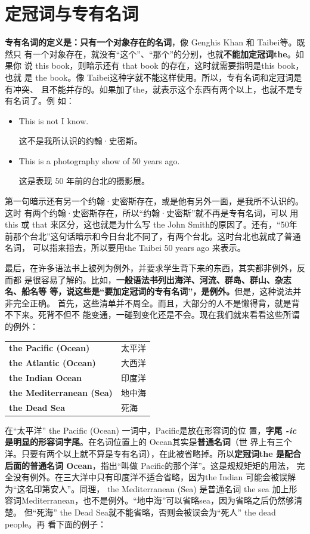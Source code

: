 \section{定冠词与专有名词}

\textbf{专有名词的定义是：只有一个对象存在的名词}，像 Genghis Khan 和 Taibei等。既然只
有一个对象存在，就没有“这个”、“那个”的分别，也就\textbf{不能加定冠词the}。如果你
说 this book，则暗示还有 that book 的存在，这时就需要指明是this book，也就
是 the book。像 Taibei这种字就不能这样使用。所以，专有名词和定冠词是有冲突、
且不能并存的。如果加了the，就表示这个东西有两个以上，也就不是专有名词了。例
如：

\begin{itemize}
\item  This is not  I know.

这不是我所认识的约翰·史密斯。
\item  This is a photography show of  50 years ago.

这是表现 50 年前的台北的摄影展。
\end{itemize}

第一句暗示还有另一个约翰·史密斯存在，或是他有另外一面，是我所不认识的。这时
有两个约翰·史密斯存在，所以“约翰·史密斯”就不再是专有名词，可以
用this 或 that 来区分，这也就是为什么写 the John Smith的原因了。还有，“50年
前那个台北”这句话暗示和今日台北不同了，有两个台北。这时台北也就成了普通名词，
可以指来指去，所以要用the Taibei 50 years ago 来表示。

最后，在许多语法书上被列为例外，并要求学生背下来的东西，其实都非例外，反而都
是很容易了解的。比如，\textbf{一般语法书列出海洋、河流、群岛、群山、杂志名、船名等
  等，说这些是“要加定冠词的专有名词”，是例外。}但是，这种说法并非完全正确。
首先，这些清单并不周全。而且，大部分的人不是懒得背，就是背不下来。死背不但不
能变通，一碰到变化还是不会。现在我们就来看看这些所谓的例外：

\begin{longtable}[]{@{}ll@{}}
  \textbf{the Pacific (Ocean)} & 太平洋 \\
  \textbf{the Atlantic (Ocean)} & 大西洋 \\
  \textbf{the Indian Ocean} & 印度洋 \\
  \textbf{the Mediterranean (Sea)} & 地中海 \\
  \textbf{the Dead Sea} & 死海 \\
\end{longtable}

在“太平洋” the Pacific (Ocean) 一词中，Pacific是放在形容词的位
置，\textbf{字尾 \emph{-ic} 是明显的形容词字尾}。在名词位置上的 Ocean其实是\textbf{普通名词}（世
界上有三个洋。只要有两个以上就不算是专有名词），在此被省略掉。所以\textbf{定冠词the
  是配合后面的普通名词 Ocean}，指出“叫做 Pacific的那个洋”。这是规规矩矩的用法，
完全没有例外。在三大洋中只有印度洋不适合省略，因为the Indian 可能会被误解
为“这名印第安人”。同理， the Mediterranean (Sea) 是普通名词 the sea 加上形
容词Mediterranean，也不是例外。“地中海”可以省略sea，因为省略之后仍然够清楚。
但“死海” the Dead Sea就不能省略，否则会被误会为“死人” the dead people。再
看下面的例子：

